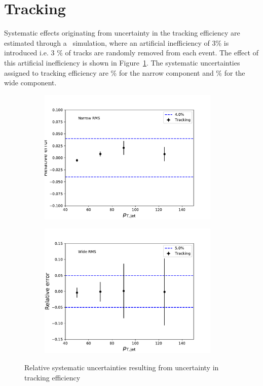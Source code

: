 \section{Tracking}
Systematic effects originating from uncertainty in the tracking efficiency are estimated through a \pythia~simulation, where an artificial inefficiency of 3\% is introduced i.e. 3 \% of tracks are randomly removed from each event. The effect of this artificial inefficiency is shown in Figure~\ref{fig:systtrack2}. The systematic uncertainties assigned to tracking efficiency are \unit[4]{\%} for the narrow component and \unit[5]{\%} for the wide component. 

\begin{figure}
\centering
\begin{subfigure}{0.45\textwidth}
\includegraphics[width=0.95\textwidth]{figures/systematics/SystematicErrorsGausRMS_Tracking.pdf}
\end{subfigure}
\begin{subfigure}{0.45\textwidth}
\includegraphics[width=0.95\textwidth]{figures/systematics/SystematicErrorsGammaRMS_Tracking.pdf}
\end{subfigure}
\caption{Relative systematic uncertainties resulting from uncertainty in tracking efficiency}
\label{fig:systtrack2}
\end{figure}

